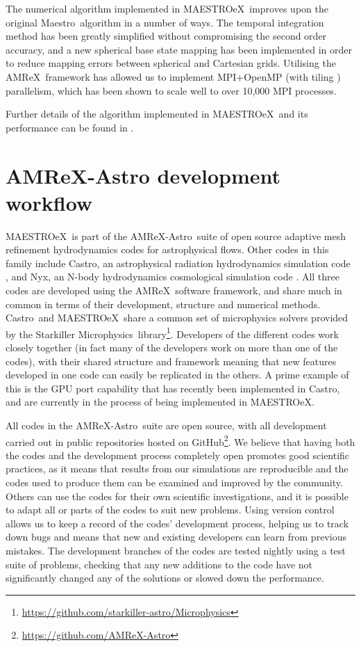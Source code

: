 \documentclass[a4paper]{jpconf}
\newcommand{\maestro}{{\sffamily Maestro}}
\newcommand{\maestroex}{{\sffamily MAESTROeX}}
\newcommand{\castro}{{\sffamily Castro}}
\newcommand{\nyx}{{\sffamily Nyx}}
\newcommand{\amrex}{{\sffamily AMReX}}
\newcommand{\starkiller}{{\sffamily Starkiller Microphysics}}
\newcommand{\amrexastro}{{\sffamily AMReX-Astro}}
\newcommand{\MarginPar}[1]{\marginpar{\vskip-\baselineskip\raggedright\tiny\sffamily\hrule\smallskip{\color{red}#1}\par\smallskip\hrule}}
\begin{document}
The numerical algorithm implemented in \maestroex~improves upon the original \maestro~algorithm in a number of ways. The temporal integration method has been greatly simplified without compromising the second order accuracy, and a new spherical base state mapping has been implemented in order to reduce mapping errors between spherical and Cartesian grids. Utilising the \amrex~framework has allowed us to implement MPI+OpenMP (with tiling \cite{Zhang2016}) parallelism, which has been shown to scale well to over 10,000 MPI processes. 

Further details of the algorithm implemented in \maestroex~and its performance can be found in \cite{Fan2019}.



\section{AMReX-Astro development workflow} \label{sec:workflow}


\maestroex~is part of the \amrexastro~suite of open source adaptive mesh refinement hydrodynamics codes for astrophysical flows. Other codes in this family include \castro, an astrophysical radiation hydrodynamics simulation code \cite{Almgren2010}, and \nyx, an N-body hydrodynamics cosmological simulation code \cite{Almgren2013}. All three codes are developed using the \amrex~software framework, and share much in common in terms of their development, structure and numerical methods. \castro~and \maestroex~share a common set of microphysics solvers provided by the \starkiller~library\footnote{\url{https://github.com/starkiller-astro/Microphysics}}. Developers of the different codes work closely together (in fact many of the developers work on more than one of the codes), with their shared structure and framework meaning that new features developed in one code can easily be replicated in the others. A prime example of this is the GPU port capability that has recently been implemented in \castro, and are currently in the process of being implemented in \maestroex. 

All codes in the \amrexastro~suite are open source, with all development carried out in public repositories hosted on GitHub\footnote{\url{https://github.com/AMReX-Astro}}. We believe that having both the codes and the development process completely open promotes good scientific practices, as it means that results from our simulations are reproducible and the codes used to produce them can be examined and improved by the community.  Others can use the codes for their own scientific investigations, and it is possible to adapt all or parts of the codes to suit new problems. Using version control allows us to keep a record of the codes' development process, helping us to track down bugs and means that new and existing developers can learn from previous mistakes. The development branches of the codes are tested nightly using a test suite of problems, checking that any new additions to the code have not significantly changed any of the solutions or slowed down the performance.
\end{document}

